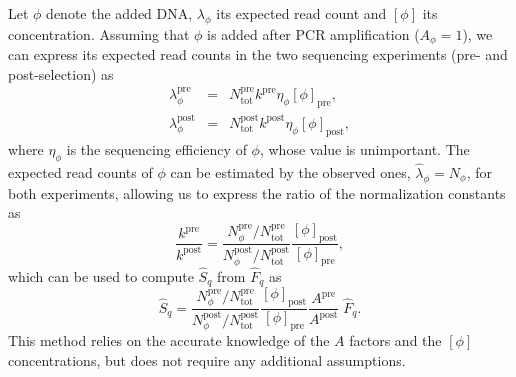 \documentclass[letter,10pt,oneside]{article}
\newcommand{\bel}{\begin{equation}}
\newcommand{\eel}{\end{equation}}
\newcommand{\bal}{\begin{eqnarray}}
\newcommand{\eal}{\end{eqnarray}}
\newcommand{\+}{^\dagger}
\begin{document}
Let $\phi$ denote the added DNA, $\lambda_\phi$ its expected read count and $[\phi]$ its concentration. Assuming that $\phi$ is added after PCR amplification ($A_\phi = 1$), we can express its expected read counts in the two sequencing experiments (pre- and post-selection) as
\bal
  \lambda_\phi^\text{pre} &=& N_\text{tot}^\text{pre} k^\text{pre} \eta_\phi [\phi]_\text{pre}, \\
  \lambda_\phi^\text{post} &=& N_\text{tot}^\text{post} k^\text{post} \eta_\phi [\phi]_\text{post},
\eal
where $\eta_\phi$ is the sequencing efficiency of $\phi$, whose value is unimportant. The expected read counts of $\phi$ can be estimated by the observed ones, $\hat \lambda_\phi = N_\phi$, for both experiments, allowing us to express the ratio of the normalization constants as
\bel
  \frac{k^\text{pre}}{k^\text{post}} = \frac{N_\phi^\text{pre} / N_\text{tot}^\text{pre}}{N_\phi^\text{post} / N_\text{tot}^\text{post}}\frac{[\phi]_\text{post}}{[\phi]_\text{pre}},
\eel
which can be used to compute $\hat S_q$ from $\hat F_q$ as
\bel
  \hat S_q = \frac{N_\phi^\text{pre} / N_\text{tot}^\text{pre}}{N_\phi^\text{post} / N_\text{tot}^\text{post}}\frac{[\phi]_\text{post}}{[\phi]_\text{pre}}\frac{A^\text{pre}}{A^\text{post}}\;\hat F_q.
\eel
This method relies on the accurate knowledge of the $A$ factors and the $[\phi]$ concentrations, but does not require any additional assumptions.
\end{document}

